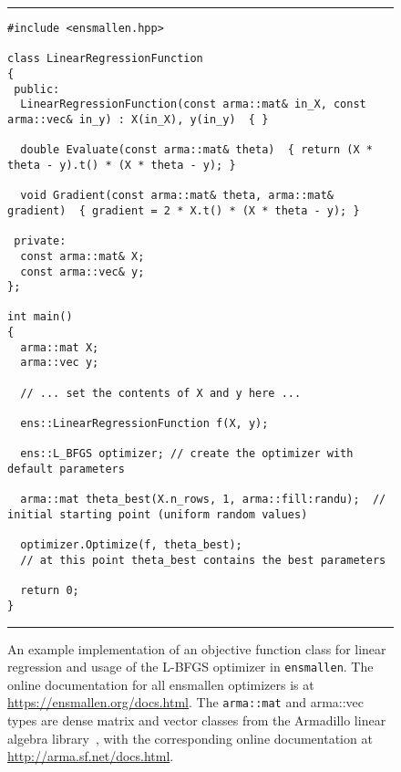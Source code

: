 


\begin{figure}[!b]
\hrule
\vspace{1ex}
\centering
\begin{verbatim}
#include <ensmallen.hpp>

class LinearRegressionFunction
{
 public:
  LinearRegressionFunction(const arma::mat& in_X, const arma::vec& in_y) : X(in_X), y(in_y)  { }

  double Evaluate(const arma::mat& theta)  { return (X * theta - y).t() * (X * theta - y); }

  void Gradient(const arma::mat& theta, arma::mat& gradient)  { gradient = 2 * X.t() * (X * theta - y); }

 private:
  const arma::mat& X;
  const arma::vec& y;
};

int main()
{
  arma::mat X;
  arma::vec y;
  
  // ... set the contents of X and y here ...
  
  ens::LinearRegressionFunction f(X, y);

  ens::L_BFGS optimizer; // create the optimizer with default parameters

  arma::mat theta_best(X.n_rows, 1, arma::fill:randu);  // initial starting point (uniform random values)

  optimizer.Optimize(f, theta_best);
  // at this point theta_best contains the best parameters

  return 0;
}
\end{verbatim}
\hrule
\vspace*{-0.5em}
\caption{An example implementation of an objective function class for linear
regression and usage of the L-BFGS optimizer in {\tt ensmallen}.
The online documentation for all ensmallen optimizers
is at \mbox{\url{https://ensmallen.org/docs.html}}.
The {\tt arma::mat} and {arma::vec} types are 
dense matrix and vector classes
from the Armadillo linear algebra library~\cite{sanderson2016armadillo},
with the corresponding online documentation at \mbox{\url{http://arma.sf.net/docs.html}}.
}
\label{fig:lr_function}
\end{figure}
